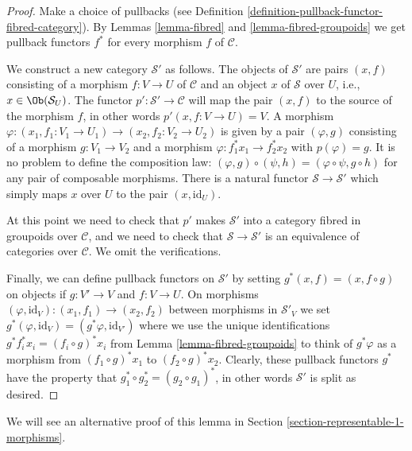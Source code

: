 \begin{proof}
Make a choice of pullbacks (see
Definition \ref{definition-pullback-functor-fibred-category}).
By Lemmas \ref{lemma-fibred} and \ref{lemma-fibred-groupoids}
we get pullback functors $f^*$ for
every morphism $f$ of $\mathcal{C}$.

\medskip\noindent
We construct a new category $\mathcal{S}'$ as follows.
The objects of $\mathcal{S}'$ are pairs $(x, f)$
consisting of a morphism $f : V \to U$ of $\mathcal{C}$
and an object $x$ of $\mathcal{S}$ over $U$, i.e.,
$x\in \Ob(\mathcal{S}_U)$. The functor
$p' : \mathcal{S}' \to \mathcal{C}$ will map the pair $(x, f)$ to the source
of the morphism $f$, in other words $p'(x, f : V\to U) = V$. A morphism
$\varphi : (x_1, f_1: V_1 \to U_1) \to (x_2, f_2 : V_2 \to U_2)$ is given by a
pair $(\varphi, g)$ consisting of a morphism $g : V_1 \to V_2$ and a morphism
$\varphi : f_1^\ast x_1 \to f_2^\ast x_2$ with $p(\varphi) = g$. It is no
problem to define the composition law: $(\varphi, g) \circ (\psi, h) =
(\varphi \circ \psi, g\circ h)$ for any pair of composable morphisms.
There is a natural functor $\mathcal{S} \to \mathcal{S}'$ which simply maps
$x$ over $U$ to the pair $(x, \text{id}_U)$.

\medskip\noindent
At this point we need to check that $p'$ makes $\mathcal{S}'$ into a category
fibred in groupoids over $\mathcal{C}$, and we need to check that
$\mathcal{S} \to \mathcal{S}'$ is an equivalence of categories over
$\mathcal{C}$. We omit the verifications.

\medskip\noindent
Finally, we can define pullback functors on $\mathcal{S}'$
by setting $g^\ast(x, f) = (x, f \circ g)$ on objects if
$g : V' \to V$ and $f : V \to U$. On morphisms
$(\varphi, \text{id}_V) : (x_1, f_1) \to (x_2, f_2)$
between morphisms in $\mathcal{S}'_V$ we set $g^\ast(\varphi, \text{id}_V) =
(g^\ast\varphi, \text{id}_{V'})$ where we use the unique identifications
$g^\ast f_i^\ast x_i = (f_i \circ g)^\ast x_i$ from Lemma
\ref{lemma-fibred-groupoids} to think of $g^\ast\varphi$ as a morphism from
$(f_1 \circ g)^\ast x_1$ to $(f_2 \circ g)^\ast x_2$. Clearly, these pullback
functors $g^\ast$ have the property that
$g_1^\ast \circ g_2^\ast = (g_2\circ g_1)^\ast$, in other words $\mathcal{S}'$
is split as desired.
\end{proof}

\noindent
We will see an alternative proof of this lemma in
Section \ref{section-representable-1-morphisms}.








